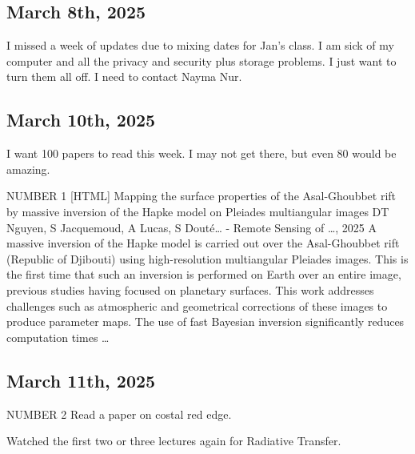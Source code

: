 \documentclass{article}
\begin{document}
\subsection{March 8th, 2025}
I missed a week of updates due to mixing dates for Jan's class. I am sick of my computer and all the privacy and security plus storage problems. I just want to turn them all off. I need to contact Nayma Nur. 


\subsection{March 10th, 2025}
I want 100 papers to read this week. I may not get there, but even 80 would be amazing. 

NUMBER 1 
[HTML] Mapping the surface properties of the Asal-Ghoubbet rift by massive inversion of the Hapke model on Pleiades multiangular images
DT Nguyen, S Jacquemoud, A Lucas, S Douté… - Remote Sensing of …, 2025
A massive inversion of the Hapke model is carried out over the Asal-Ghoubbet rift
(Republic of Djibouti) using high-resolution multiangular Pleiades images. This is the
first time that such an inversion is performed on Earth over an entire image, previous
studies having focused on planetary surfaces. This work addresses challenges such
as atmospheric and geometrical corrections of these images to produce parameter
maps. The use of fast Bayesian inversion significantly reduces computation times …

\subsection{March 11th, 2025}
NUMBER 2
Read a paper on costal red edge. 

Watched the first two or three lectures again for Radiative Transfer. 








\end{document}
